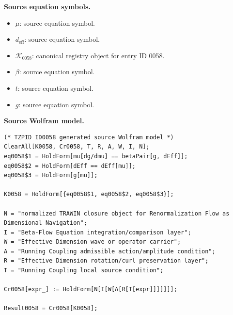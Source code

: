 \begin{minipage}[t]{0.49\linewidth}
\begingroup
\small
\raggedright
\textbf{Source equation symbols.}\par
\begin{itemize}[leftmargin=1.35em,itemsep=1pt,topsep=1pt,parsep=0pt]
    \item $\mu$: source equation symbol.
    \item $d_{\mathrm{eff}}$: source equation symbol.
    \item $\mathcal{K}_{0058}$: canonical registry object for entry ID 0058.
    \item $\beta$: source equation symbol.
    \item $t$: source equation symbol.
    \item $g$: source equation symbol.
\end{itemize}
\endgroup
\end{minipage}\hfill
\begin{minipage}[t]{0.47\linewidth}
\begingroup
\scriptsize
\raggedright
\textbf{Source Wolfram model.}\par
\begin{Verbatim}[fontsize=\tiny,breaklines=true,breakanywhere=true]
(* TZPID ID0058 generated source Wolfram model *)
ClearAll[K0058, Cr0058, T, R, A, W, I, N];
eq0058$1 = HoldForm[mu[dg/dmu] == betaPair[g, dEff]];
eq0058$2 = HoldForm[dEff == dEff[mu]];
eq0058$3 = HoldForm[g[mu]];

K0058 = HoldForm[{eq0058$1, eq0058$2, eq0058$3}];

N = "normalized TRAWIN closure object for Renormalization Flow as Dimensional Navigation";
I = "Beta-Flow Equation integration/comparison layer";
W = "Effective Dimension wave or operator carrier";
A = "Running Coupling admissible action/amplitude condition";
R = "Effective Dimension rotation/curl preservation layer";
T = "Running Coupling local source condition";

Cr0058[expr_] := HoldForm[N[I[W[A[R[T[expr]]]]]]];

Result0058 = Cr0058[K0058];
\end{Verbatim}
\endgroup
\end{minipage}

